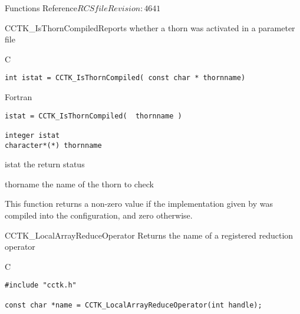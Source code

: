\begin{cactuspart}{ Functions Reference}{$RCSfile$}{$Revision: 4641 $}
\begin{FunctionDescription}{CCTK\_IsThornCompiled}{Reports whether a thorn was activated in a parameter file}
\label{CCTK-IsThornCompiled}
\begin{SynopsisSection}
\begin{Synopsis}{C}
\begin{verbatim}int istat = CCTK_IsThornCompiled( const char * thornname)\end{verbatim}
\end{Synopsis}
\begin{Synopsis}{Fortran}
\begin{verbatim}istat = CCTK_IsThornCompiled(  thornname )

integer istat
character*(*) thornname\end{verbatim}
\end{Synopsis}
\end{SynopsisSection}
\begin{ParameterSection}
\begin{Parameter}{istat}
the return status
\end{Parameter}
\begin{Parameter}{thorname}
the name of the thorn to check
\end{Parameter}
\end{ParameterSection}
\begin{Discussion}
This function returns a non-zero value if the implementation given by
 was compiled into the configuration, and zero
otherwise.
\end{Discussion}
\end{FunctionDescription}






\begin{FunctionDescription}{CCTK\_LocalArrayReduceOperator}
\label{CCTK-LocalArrayReduceOperator}
Returns the name of a registered reduction operator

\begin{SynopsisSection}
\begin{Synopsis}{C}
\begin{verbatim}
#include "cctk.h"

const char *name = CCTK_LocalArrayReduceOperator(int handle);
\end{verbatim}
\end{Synopsis}
\end{SynopsisSection}


\end{FunctionDescription}
\end{cactuspart}
